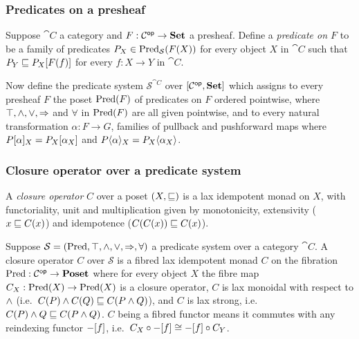 \subsubsection{Predicates on a presheaf}

Suppose $\cat{C}$ a category and $F: \mathcal{C}^{\mathsf{op}} \to \mathbf{Set}$ a presheaf. Define a \emph{predicate on $F$} to be
a family of predicates $P_X \in \mathrm{Pred}_\mathcal{S}(F(X))$ for every object $X$ in $\cat{C}$ such that $P_Y
\sqsubseteq P_X[F(f)]$ for every $f: X \to Y$ in $\cat{C}$.

Now define the predicate system $\mathcal{S}^{\cat{C}}$ over $[\mathcal{C}^{\mathsf{op}},\mathbf{Set}]$ which assigns to every
presheaf $F$ the poset $\mathrm{Pred}(F)$ of predicates on $F$ ordered pointwise, where $\top, \wedge, \vee,
\Rightarrow$ and $\forall$ in $\mathrm{Pred}(F)$ are all given pointwise, and to every natural transformation $\alpha: F
\to G$, families of pullback and pushforward maps where $P[\alpha]_X = P_X[\alpha_X]$ and
$P\langle\alpha\rangle_X = P_X\langle\alpha_X\rangle$.

\subsubsection{Closure operator over a predicate system}

A \emph{closure operator} $C$ over a poset $(X, \sqsubseteq)$ is a lax idempotent monad on $X$, with functoriality,
unit and multiplication given by monotonicity, extensivity ($x \sqsubseteq C(x)$) and idempotence ($C(C(x)) \sqsubseteq
C(x)$).

Suppose $\mathcal{S} = (\mathrm{Pred}, \top, \wedge, \vee, \Rightarrow, \forall)$ a predicate system over a category
$\cat{C}$. A closure operator $C$ over $\mathcal{S}$ is a fibred lax idempotent monad $C$ on the fibration
$\mathrm{Pred}: \mathcal{C}^{\mathsf{op}} \to \mathbf{Poset}$ where for every object $X$ the fibre map $C_X: \mathrm{Pred}(X) \to \mathrm{Pred}(X)$ is a
closure operator, $C$ is lax monoidal with respect to $\wedge$ (i.e.~$C(P) \wedge C(Q) \sqsubseteq C(P \wedge Q)$),
and $C$ is lax strong, i.e.~$C(P) \wedge Q \sqsubseteq C(P \wedge Q)$. $C$ being a fibred functor means it commutes
with any reindexing functor $-[f]$, i.e.~$C_X \circ -[f] \cong -[f] \circ C_Y$.

%
%
